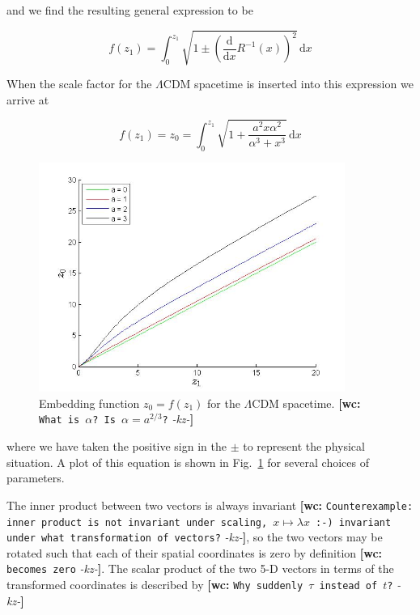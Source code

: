\documentclass[preprint,notitlepage,amsmath,amssymb,floatfix]{revtex4-1}
\newcommand{\XXX}[3]{{\bf [#1: } {\tt #3} {\it -#2-}{\bf ]}}
\begin{document}
\noindent and we find the resulting general expression to be

\begin{equation}
f\left(z_1\right) = \int_0^{z_1}\!\sqrt{1\pm\left(\frac{\mathrm d}{\mathrm dx}R^{-1}\left(x\right)\right)^2}\,\mathrm dx
\end{equation}

\noindent When the scale factor for the $\Lambda$CDM spacetime is inserted into this expression we arrive at

\begin{equation}
f\left(z_1\right) = z_0 = \int_0^{z_1}\!\sqrt{1+\frac{a^2x\alpha^2}{\alpha^3+x^3}}\,\mathrm dx
\end{equation}

\begin{figure}
\includegraphics[width=10cm]{figures/Embedding.jpg}
\caption{Embedding function $z_0 = f\left(z_1\right)$ for the $\Lambda$CDM spacetime. \XXX{wc}{kz}{What is $\alpha$? Is $\alpha=a^{2/3}$?}}
\label{fig:embedding}
\centering
\end{figure}

\noindent where we have taken the positive sign in the $\pm$ to represent the physical situation.  A plot of this equation is shown in Fig.~\ref{fig:embedding} for several choices of parameters. \par
The inner product between two vectors is always invariant \XXX{wc}{kz}{Counterexample: inner product is not invariant under scaling, $x\mapsto\lambda x$ :-) invariant under what transformation of vectors?}, so the two vectors may be rotated such that each of their spatial coordinates is zero by definition \XXX{wc}{kz}{becomes zero}.  
The scalar product of the two 5-D vectors in terms of the transformed coordinates is described by \XXX{wc}{kz}{Why suddenly $\tau$ instead of $t$?}
\end{document}
